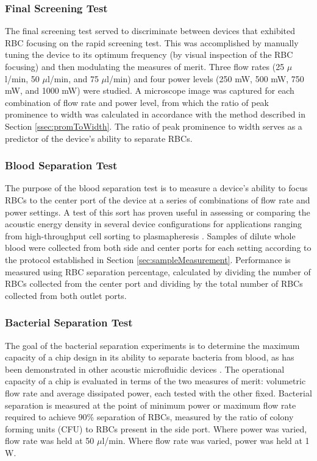 \subsubsection{Final Screening Test}
\label{sssec:finalScreen}

The final screening test served to discriminate between devices that exhibited RBC focusing on the rapid screening test. This was accomplished by manually tuning the device to its optimum frequency (by visual inspection of the RBC focusing) and then modulating the measures of merit. Three flow rates (25 $\mu$l/min, 50 $\mu$l/min, and 75 $\mu$l/min) and four power levels (250 mW, 500 mW, 750 mW, and 1000 mW) were studied. A microscope image was captured for each combination of flow rate and power level, from which the ratio of peak prominence to width was calculated in accordance with the method described in Section \ref{ssec:promToWidth}.  The ratio of peak prominence to width serves as a predictor of the device's ability to separate RBCs.

\subsubsection{Blood Separation Test}
\label{ssec:bloodAssay}

The purpose of the blood separation test is to measure a device's ability to focus RBCs to the center port of the device at a series of combinations of flow rate and power settings. A test of this sort has proven useful in assessing or comparing the acoustic energy density in several device configurations for applications ranging from high-throughput cell sorting \cite{adams2012high}\cite{mueller2013continuous} to plasmapheresis \cite{lenshof2009acoustic}. Samples of dilute whole blood were collected from both side and center ports for each setting according to the protocol established in Section \ref{sec:sampleMeasurement}. Performance is measured using RBC separation percentage, calculated by dividing the number of RBCs collected from the center port and dividing by the total number of RBCs collected from both outlet ports.

\subsubsection{Bacterial Separation Test}
\label{ssec:bacteriaAssay}

The goal of the bacterial separation experiments is to determine the maximum capacity of a chip design in its ability to separate bacteria from blood, as has been demonstrated in other acoustic microfluidic devices \cite{ohlsson2016integrated}\cite{li2016acoustofluidic}. The operational capacity of a chip is evaluated in terms of the two measures of merit: volumetric flow rate and average dissipated power, each tested with the other fixed.  Bacterial separation is measured at the point of minimum power or maximum flow rate required to achieve 90\% separation of RBCs, measured by the ratio of colony forming units (CFU) to RBCs present in the side port.  Where power was varied, flow rate was held at 50 $\mu$l/min.  Where flow rate was varied, power was held at 1 W. 


